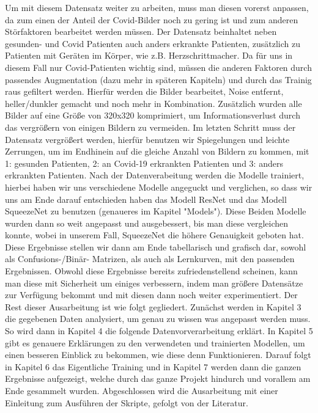 \newline
Um mit diesem Datensatz weiter zu arbeiten, muss man diesen vorerst anpassen, da zum einen der Anteil der Covid-Bilder noch zu gering ist und zum anderen Störfaktoren bearbeitet werden müssen. Der Datensatz beinhaltet neben gesunden- und Covid Patienten auch anders erkrankte Patienten, zusätzlich zu Patienten mit Geräten im Körper, wie z.B. Herzschrittmacher. Da für uns in diesem Fall nur Covid-Patienten wichtig sind, müssen die anderen Faktoren durch passendes Augmentation (dazu mehr in späteren Kapiteln) und durch das Trainig raus gefiltert werden. Hierfür werden die Bilder bearbeitet, Noise entfernt, heller/dunkler gemacht und noch mehr in Kombination. Zusätzlich wurden alle Bilder auf eine Größe von 320x320 komprimiert, um Informationsverlust durch das vergrößern von einigen Bildern zu vermeiden. Im letzten Schritt muss der Datensatz vergrößert werden, hierfür benutzen wir Spiegelungen und leichte Zerrungen, um im Endhinein auf die gleiche Anzahl von Bildern zu kommen, mit 1: gesunden Patienten, 2: an Covid-19 erkrankten Patienten und 3: anders erkrankten Patienten.
\newline
Nach der Datenverabeitung werden die Modelle trainiert, hierbei haben wir uns verschiedene Modelle angeguckt und verglichen, so dass wir uns am Ende darauf entschieden haben das Modell ResNet und das Modell SqueezeNet zu benutzen (genaueres im Kapitel "Models"). Diese Beiden Modelle wurden dann so weit angepasst und ausgebessert, bis man diese vergleichen konnte, wobei in unserem Fall, SqueezeNet die höhere Genauigkeit geboten hat. Diese Ergebnisse stellen wir dann am Ende tabellarisch und grafisch dar, sowohl als Confusions-/Binär- Matrizen, als auch als Lernkurven, mit den passenden Ergebnissen.
\newline
Obwohl diese Ergebnisse bereits zufriedenstellend scheinen, kann man diese mit Sicherheit um einiges verbessern, indem man größere Datensätze zur Verfügung bekommt und mit diesen dann noch weiter experimentiert.
\newline
Der Rest dieser Ausarbeitung ist wie folgt gegliedert. Zunächst werden in Kapitel 3 die gegebenen Daten analysiert, um genau zu wissen was angepasst werden muss. So wird dann in Kapitel 4 die folgende Datenvorverarbeitung erklärt. In Kapitel 5 gibt es genauere Erklärungen zu den verwendeten und trainierten Modellen, um einen besseren Einblick zu bekommen, wie diese denn Funktionieren. Darauf folgt in Kapitel 6 das Eigentliche Training und in Kapitel 7 werden dann die ganzen Ergebnisse aufgezeigt, welche durch das ganze Projekt hindurch und vorallem am Ende gesammelt wurden. Abgeschlossen wird die Ausarbeitung mit einer Einleitung zum Ausführen der Skripte, gefolgt von der Literatur.


